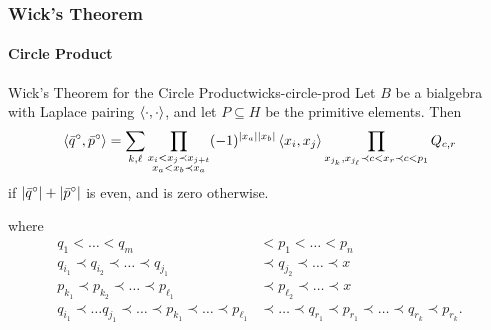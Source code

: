\documentclass{beamer}
\begin{document}
\begin{frame}

\frametitle{Wick's Theorem}

\framesubtitle{Circle Product}

\begin{prop}{Wick's Theorem for the Circle Product}{wicks-circle-prod}
Let $B$ be a bialgebra with Laplace pairing $\left\langle \cdot, \cdot \right\rangle$, and let $P \subseteq H$ be the primitive elements. Then
\begin{equation}
\left\langle \bar{q}^\circ, \bar{p}^\circ \right\rangle = \sum_{k, \ell} \prod_{\substack{x_i < x_j \prec x_{j+t} \\ x_a < x_b \prec x_a}} (-1)^{| x_a | | x_b |} \left\langle x_i,x_j \right\rangle \prod_{x_{j_k}, x_{j_\ell} \prec c < x_r \prec c < p_1} Q_{c,r}
\end{equation}
if $| \bar{q}^\circ | + | \bar{p}^\circ |$ is even, and is zero otherwise.
\end{prop}

where 
\begin{align*}
q_1 < \ldots < q_m &< p_1 < \ldots < p_n \\
q_{i_1} \prec q_{i_2}  \prec \ldots \prec q_{j_1} &\prec  q_{j_2} \prec \ldots \prec x \\
p_{k_1} \prec p_{k_2} \prec \ldots \prec p_{\ell_1} &\prec p_{\ell_2} \prec \ldots \prec x \\
q_{i_1} \prec \ldots q_{j_1} \prec \ldots \prec p_{k_1} \prec \ldots \prec p_{\ell_1} &\prec \ldots \prec q_{r_1} \prec p_{r_1} \prec \ldots \prec q_{r_k} \prec p_{r_k}.
\end{align*}

\end{frame}


\end{document}

